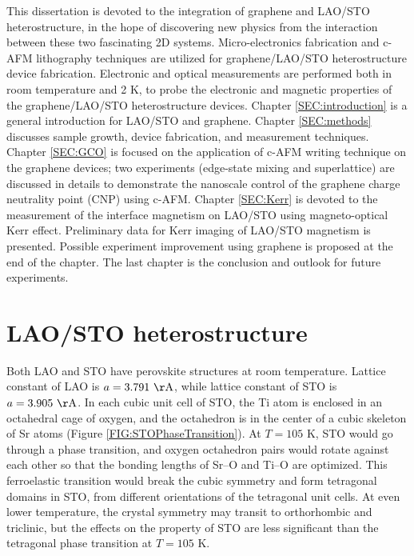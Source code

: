\documentclass[pdflatex, sectionletters, 12pt]{pittetd}    %
\begin{document}
This dissertation is devoted to the integration of graphene and LAO/STO heterostructure, in the hope of discovering new physics from the interaction between these two fascinating 2D systems. Micro-electronics fabrication and c-AFM lithography techniques are utilized for graphene/LAO/STO heterostructure device fabrication. Electronic and optical measurements are performed both in room temperature and 2 K, to probe the electronic and magnetic properties of the graphene/LAO/STO heterostructure devices. Chapter \ref{SEC:introduction} is a general introduction for LAO/STO and graphene. Chapter \ref{SEC:methods} discusses sample growth, device fabrication, and measurement techniques. Chapter \ref{SEC:GCO} is focused on the application of c-AFM writing technique on the graphene devices; two experiments (edge-state mixing and superlattice) are discussed in details to demonstrate the nanoscale control of the graphene charge neutrality point (CNP) using c-AFM. Chapter \ref{SEC:Kerr} is devoted to the measurement of the interface magnetism on LAO/STO using magneto-optical Kerr effect. Preliminary data for Kerr imaging of LAO/STO magnetism is presented. Possible experiment improvement using graphene is proposed at the end of the chapter. The last chapter is the conclusion and outlook for future experiments.

\section{LAO/STO heterostructure}

Both LAO and STO have perovskite structures at room temperature. Lattice constant of LAO is $a = 3.791 \ \mathrm{\AA}$\cite{geller1956crystallographic}, while lattice constant of STO is $a = 3.905 \ \mathrm{\AA}$. In each cubic unit cell of STO, the Ti atom is enclosed in an octahedral cage of oxygen, and the octahedron is in the center of a cubic skeleton of Sr atoms (Figure \ref{FIG:STOPhaseTransition}). At $T=105$ K, STO would go through a phase transition, and oxygen octahedron pairs would rotate against each other so that the bonding lengths of Sr--O and Ti--O are optimized\cite{sulpizio2014nanoscale}. This ferroelastic transition would break the cubic symmetry and form tetragonal domains in STO, from different orientations of the tetragonal unit cells. At even lower temperature, the crystal symmetry may transit to orthorhombic and triclinic, but the effects on the property of STO are less significant than the tetragonal phase transition at $T=105$ K.
\\
\end{document}
